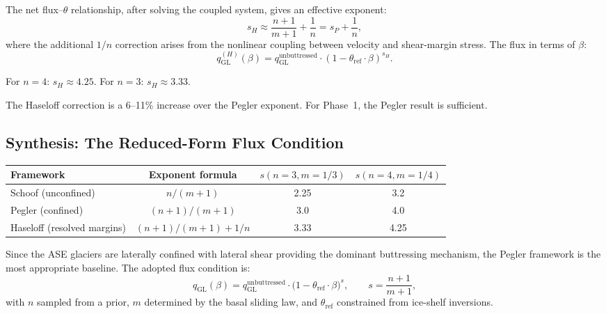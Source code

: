 \documentclass[11pt]{article}
\theoremstyle{definition}
\begin{document}
The net flux--$\theta$ relationship, after solving the coupled system, gives an effective exponent:
\begin{equation}
  s_H \approx \frac{n+1}{m+1} + \frac{1}{n} = s_P + \frac{1}{n},
  \label{eq:s_haseloff}
\end{equation}
where the additional $1/n$ correction arises from the nonlinear coupling between velocity and shear-margin stress.  The flux in terms of $\beta$:
\begin{equation}
  q_\text{GL}^{(H)}(\beta) = q_\text{GL}^{\text{unbuttressed}} \cdot (1 - \theta_{\text{ref}} \cdot \beta)^{s_H}.
  \label{eq:haseloff_beta}
\end{equation}

For $n = 4$: $s_H \approx 4.25$.  For $n = 3$: $s_H \approx 3.33$.

The Haseloff correction is a 6--11\% increase over the Pegler exponent.  For Phase~1, the Pegler result is sufficient.

\subsection{Synthesis: The Reduced-Form Flux Condition}
\label{sec:s_synthesis}

\begin{center}
\begin{tabular}{lccc}
  \toprule
  \textbf{Framework} & \textbf{Exponent formula} & $s(n{=}3, m{=}1/3)$ & $s(n{=}4, m{=}1/4)$ \\
  \midrule
  Schoof (unconfined) & $n/(m+1)$ & 2.25 & 3.2 \\
  Pegler (confined) & $(n+1)/(m+1)$ & 3.0 & 4.0 \\
  Haseloff (resolved margins) & $(n+1)/(m+1) + 1/n$ & 3.33 & 4.25 \\
  \bottomrule
\end{tabular}
\end{center}

Since the ASE glaciers are laterally confined with lateral shear providing the dominant buttressing mechanism, the Pegler framework is the most appropriate baseline.  The adopted flux condition is:
\begin{equation}
  \boxed{q_\text{GL}(\beta) = q_\text{GL}^{\text{unbuttressed}} \cdot \bigl(1 - \theta_{\text{ref}} \cdot \beta\bigr)^{s}, \qquad s = \frac{n + 1}{m + 1},}
  \label{eq:flux_adopted}
\end{equation}
with $n$ sampled from a prior, $m$ determined by the basal sliding law, and $\theta_{\text{ref}}$ constrained from ice-shelf inversions.
\end{document}
